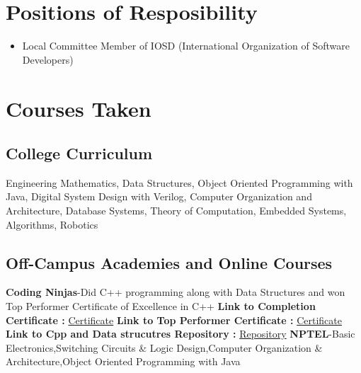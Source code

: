 \documentclass[a4paper,12pt]{article}
\begin{document}
\section*{Positions of Resposibility}
    \begin{itemize}
        \item Local Committee Member of IOSD
        (International Organization of Software Developers)
    \end{itemize}
\pagebreak
\section*{Courses Taken}
    \subsection*{College Curriculum}
    Engineering Mathematics, 
    Data Structures,
    Object Oriented Programming with Java,
    Digital System Design with Verilog,
    Computer Organization and Architecture,
    Database Systems,
    Theory of Computation,
    Embedded Systems,
    Algorithms,
    Robotics 
    \subsection*{Off-Campus Academies and Online Courses}
    \textbf{Coding Ninjas}-Did C++ programming along with Data Structures 
    and won Top Performer Certificate of Excellence in C++
    \newline
    \textbf{Link to Completion Certificate :} \href{https://github.com/teetangh/Kaustav-All-Certifications/blob/master/Programming/Coding%20Ninjas/Coding%20Ninjas%20Cpp%20Completion%20Certificate.pdf}{Certificate}
    \newline
    \textbf{Link to Top Performer Certificate :} \href{https://github.com/teetangh/Kaustav-All-Certifications/blob/master/Programming/Coding%20Ninjas/Coding%20Ninjas%20Cpp%20Top%20Performer%20Certificate.pdf}{Certificate}
    \newline
    \textbf{Link to Cpp and Data strucutres Repository :} \href{https://github.com/teetangh/Kaustav-Competitive-Coding}{Repository}
    \newline
    \textbf{NPTEL}-Basic Electronics,Switching Circuits \& Logic Design,Computer Organization \& Architecture,Object Oriented Programming with Java
    
\end{document}
